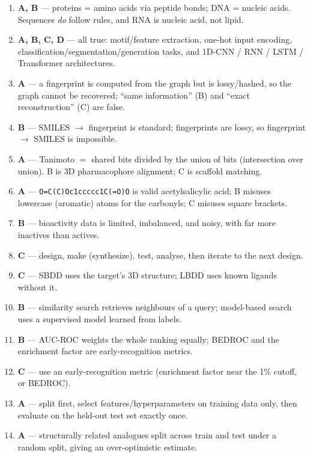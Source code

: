 \documentclass[11pt,oneside]{article}
\begin{document}
\begin{enumerate}[label=\textbf{Q\arabic*.}, leftmargin=3em, itemsep=4pt]
  \item \textbf{A, B} --- proteins = amino acids via peptide bonds; DNA = nucleic acids. Sequences \emph{do} follow rules, and RNA is nucleic acid, not lipid.
  \item \textbf{A, B, C, D} --- all true: motif/feature extraction, one-hot input encoding, classification/segmentation/generation tasks, and 1D-CNN / RNN / LSTM / Transformer architectures.
  \item \textbf{A} --- a fingerprint is computed from the graph but is lossy/hashed, so the graph cannot be recovered; ``same information'' (B) and ``exact reconstruction'' (C) are false.
  \item \textbf{B} --- SMILES $\to$ fingerprint is standard; fingerprints are lossy, so fingerprint $\to$ SMILES is impossible.
  \item \textbf{A} --- Tanimoto $=$ shared bits divided by the union of bits (intersection over union). B is 3D pharmacophore alignment; C is scaffold matching.
  \item \textbf{A} --- \texttt{O=C(C)Oc1ccccc1C(=O)O} is valid acetylsalicylic acid; B misuses lowercase (aromatic) atoms for the carbonyls; C misuses square brackets.
  \item \textbf{B} --- bioactivity data is limited, imbalanced, and noisy, with far more inactives than actives.
  \item \textbf{C} --- design, make (synthesize), test, analyse, then iterate to the next design.
  \item \textbf{C} --- SBDD uses the target's 3D structure; LBDD uses known ligands without it.
  \item \textbf{B} --- similarity search retrieves neighbours of a query; model-based search uses a supervised model learned from labels.
  \item \textbf{B} --- AUC-ROC weights the whole ranking equally; BEDROC and the enrichment factor are early-recognition metrics.
  \item \textbf{C} --- use an early-recognition metric (enrichment factor near the 1\% cutoff, or BEDROC).
  \item \textbf{A} --- split first, select features/hyperparameters on training data only, then evaluate on the held-out test set exactly once.
  \item \textbf{A} --- structurally related analogues split across train and test under a random split, giving an over-optimistic estimate.

\end{enumerate}
\end{document}
